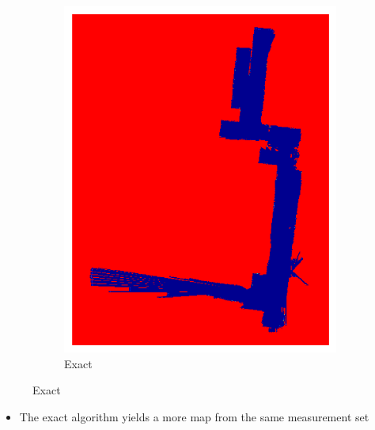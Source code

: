 \documentclass[11pt,professionalfonts,hyperref={pdftex,pdfpagemode=none,pdfstartview=FitH}]{beamer}
\renewcommand{\emph}[1]{\textit{\textbf{\color{blue}{#1}}}}
\begin{document}
\begin{frame}
\begin{minipage}[t]{5.0cm}
\begin{figure}[!htbp]
    \begin{subfigure}{0.5\textwidth}
        \centering
        \includegraphics[width=\textwidth]{EISM_Image_inf_19.pdf}
        \caption*{Exact}
    \end{subfigure}
\end{figure}
\end{minipage}


\begin{itemize}
\item The exact algorithm yields a more \emph{certain} map from the same measurement set
\end{itemize}

\end{frame}
\end{document}
